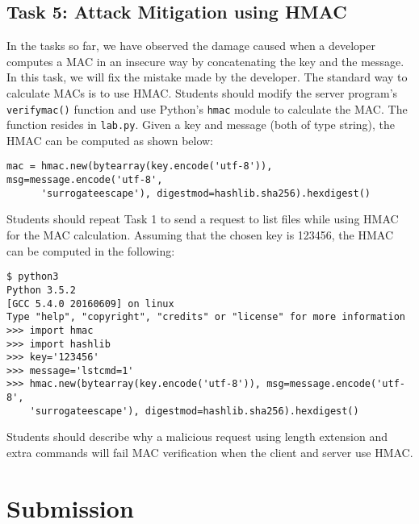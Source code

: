 \subsection{Task 5: Attack Mitigation using HMAC}

In the tasks so far, we have observed the damage caused when a developer
computes a MAC in an insecure way by concatenating the key and the message.
In this task, we will fix the mistake made by the developer. The standard
way to calculate MACs is to use HMAC. Students
should modify the server program's \texttt{verify\textunderscore mac()}
function and use Python's \texttt{hmac} module to calculate the MAC. The
function resides in \texttt{lab.py}. Given a key and message (both of type
string), the HMAC can be computed as shown below:

\begin{lstlisting}
mac = hmac.new(bytearray(key.encode('utf-8')), msg=message.encode('utf-8',
      'surrogateescape'), digestmod=hashlib.sha256).hexdigest()
\end{lstlisting}

Students should repeat Task 1 to send a request to list files while using HMAC for
the MAC calculation. Assuming that the chosen key is 123456, the HMAC can be computed
in the following:

\begin{lstlisting}
$ python3
Python 3.5.2
[GCC 5.4.0 20160609] on linux
Type "help", "copyright", "credits" or "license" for more information
>>> import hmac
>>> import hashlib
>>> key='123456'
>>> message='lstcmd=1'
>>> hmac.new(bytearray(key.encode('utf-8')), msg=message.encode('utf-8',
	'surrogateescape'), digestmod=hashlib.sha256).hexdigest()
\end{lstlisting}

Students should describe why a malicious request using length extension and
extra commands will fail MAC verification when the client and server use
HMAC.


\section{Submission}





